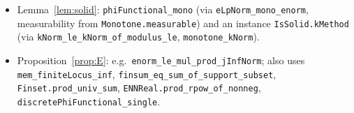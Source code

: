 \documentclass[11pt]{article}
\theoremstyle{definition}
\theoremstyle{remark}
\begin{document}
\begin{itemize}
    \texttt{ENNReal.tendsto\_finsetProd\_of\_ne\_top}, \texttt{ge\_of\_tendsto'}.
  \item Lemma~\ref{lem:solid}: \texttt{phiFunctional\_mono} (via \texttt{eLpNorm\_mono\_enorm},
    measurability from \texttt{Monotone.measurable}) and an instance
    \texttt{IsSolid.kMethod} (via \texttt{kNorm\_le\_kNorm\_of\_modulus\_le},
    \texttt{monotone\_kNorm}).
  \item Proposition~\ref{prop:E}: e.g.\ \texttt{enorm\_le\_mul\_prod\_jInfNorm}; also uses
    \texttt{mem\_finiteLocus\_inf}, \texttt{finsum\_eq\_sum\_of\_support\_subset},
    \texttt{Finset.prod\_univ\_sum}, \texttt{ENNReal.prod\_rpow\_of\_nonneg},
    \texttt{discretePhiFunctional\_single}.
\end{itemize}
\end{document}
